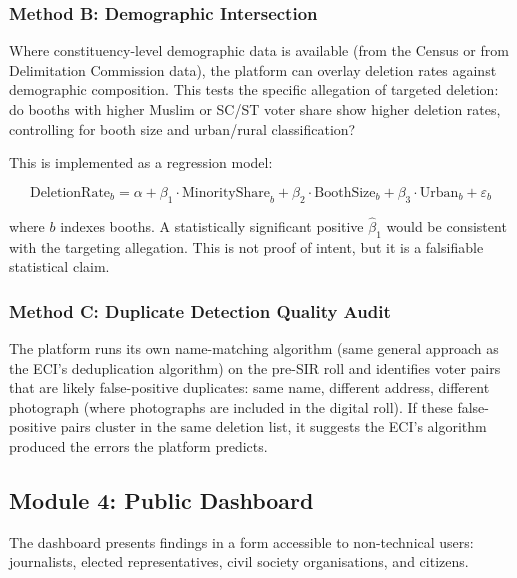 \documentclass[11pt, a4paper]{article}
\begin{document}
\subsubsection{Method B: Demographic Intersection}

Where constituency-level demographic data is available (from the Census or from Delimitation Commission data), the platform can overlay deletion rates against demographic composition. This tests the specific allegation of targeted deletion: do booths with higher Muslim or SC/ST voter share show higher deletion rates, controlling for booth size and urban/rural classification?

This is implemented as a regression model:

\[
\text{DeletionRate}_{b} = \alpha + \beta_1 \cdot \text{MinorityShare}_{b} + \beta_2 \cdot \text{BoothSize}_{b} + \beta_3 \cdot \text{Urban}_{b} + \varepsilon_{b}
\]

where $b$ indexes booths. A statistically significant positive $\hat{\beta}_1$ would be consistent with the targeting allegation. This is not proof of intent, but it is a falsifiable statistical claim.

\subsubsection{Method C: Duplicate Detection Quality Audit}

The platform runs its own name-matching algorithm (same general approach as the ECI's deduplication algorithm) on the pre-SIR roll and identifies voter pairs that are likely false-positive duplicates: same name, different address, different photograph (where photographs are included in the digital roll). If these false-positive pairs cluster in the same deletion list, it suggests the ECI's algorithm produced the errors the platform predicts.

\subsection{Module 4: Public Dashboard}

The dashboard presents findings in a form accessible to non-technical users: journalists, elected representatives, civil society organisations, and citizens.
\end{document}
